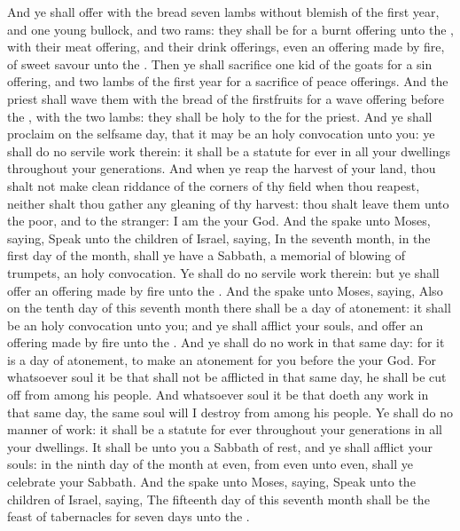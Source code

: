 \begin{biblechapter}
\verse And ye shall offer with the bread seven lambs without blemish of the first year, and one young bullock, and two rams: they shall be for a burnt offering unto the \LORD, with their meat offering, and their drink offerings, even an offering made by fire, of sweet savour unto the \LORD.
\verse Then ye shall sacrifice one kid of the goats for a sin offering, and two lambs of the first year for a sacrifice of peace offerings.
\verse And the priest shall wave them with the bread of the firstfruits for a wave offering before the \LORD, with the two lambs: they shall be holy to the \LORD for the priest.
\verse And ye shall proclaim on the selfsame day, that it may be an holy convocation unto you: ye shall do no servile work therein: it shall be a statute for ever in all your dwellings throughout your generations.
\verse And when ye reap the harvest of your land, thou shalt not make clean riddance of the corners of thy field when thou reapest, neither shalt thou gather any gleaning of thy harvest: thou shalt leave them unto the poor, and to the stranger: I am the \LORD your God.
 And the \LORD spake unto Moses, saying,
\verse Speak unto the children of Israel, saying, In the seventh month, in the first day of the month, shall ye have a Sabbath, a memorial of blowing of trumpets, an holy convocation.
\verse Ye shall do no servile work therein: but ye shall offer an offering made by fire unto the \LORD.
 And the \LORD spake unto Moses, saying,
\verse Also on the tenth day of this seventh month there shall be a day of atonement: it shall be an holy convocation unto you; and ye shall afflict your souls, and offer an offering made by fire unto the \LORD.
\verse And ye shall do no work in that same day: for it is a day of atonement, to make an atonement for you before the \LORD your God.
\verse For whatsoever soul it be that shall not be afflicted in that same day, he shall be cut off from among his people.
\verse And whatsoever soul it be that doeth any work in that same day, the same soul will I destroy from among his people.
\verse Ye shall do no manner of work: it shall be a statute for ever throughout your generations in all your dwellings.
\verse It shall be unto you a Sabbath of rest, and ye shall afflict your souls: in the ninth day of the month at even, from even unto even, shall ye celebrate your Sabbath.
 And the \LORD spake unto Moses, saying,
\verse Speak unto the children of Israel, saying, The fifteenth day of this seventh month shall be the feast of tabernacles for seven days unto the \LORD.

\end{biblechapter}
